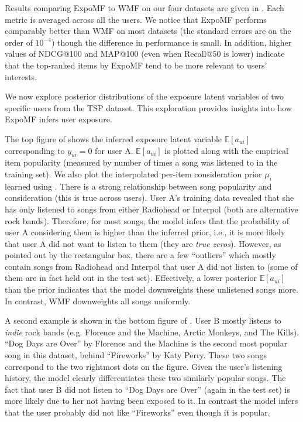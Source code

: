  Results comparing ExpoMF to WMF on our four
datasets are given in
. Each metric is averaged across all the users.
We notice that ExpoMF performs comparably better than WMF on most
datasets (the standard errors are on the order of $10^{-4}$) %
though the difference in performance is small. In addition, higher values
of NDCG@100 and MAP@100 (even when Recall@$50$ is lower) indicate that the
top-ranked items by ExpoMF tend to be more relevant to users' interests.  


 We now explore 
posterior distributions of the exposure latent variables of two specific users from the TSP dataset. This
exploration provides insights into how ExpoMF infers user exposure. 

The top figure of  shows the inferred exposure latent variable
$\mathbb{E}[a_{ui}]$ corresponding to $y_{ui} = 0$ for user A.
$\mathbb{E}[a_{ui}]$ is plotted along with the empirical item popularity
(measured by number of times a song was listened to in the training set).
We also plot the interpolated per-item consideration prior $\mu_i$ 
learned using . There is a strong relationship between song
popularity and consideration (this is true across users). User A's
training data revealed that she has only listened to songs from either
Radiohead or Interpol (both are alternative rock bands). Therefore, for
most songs, the model infers that the probability of user A considering
them is higher than the inferred prior, i.e., it is more likely that user
A did not want to listen to them (they are \emph{true zeros}). However, as
pointed out by the rectangular box, there
are a few ``outliers'' which mostly contain songs from Radiohead and
Interpol that user A did not listen to (some of them are in fact held out
in the test set). Effectively, a lower posterior $\mathbb{E}[a_{ui}]$ than
the prior indicates that the model downweights these unlistened songs
more. In contrast, WMF downweights all songs uniformly. 

A second example is shown in the bottom figure of . User B mostly
listens to \emph{indie} rock bands (e.g. Florence and the Machine, Arctic
Monkeys, and The Kills). ``Dog Days are Over'' by Florence and the Machine
is the second most popular song in this dataset, behind ``Fireworks'' by
Katy Perry. These two songs correspond to the two rightmost dots on the
figure. Given the user's listening history, the model clearly
differentiates these two similarly popular songs. The fact that user B did
not listen to ``Dog Days are Over'' (again in the test set) is more likely
due to her not having been exposed to it. In contrast the model infers
that the user probably did not like ``Fireworks'' even though it is
popular.


